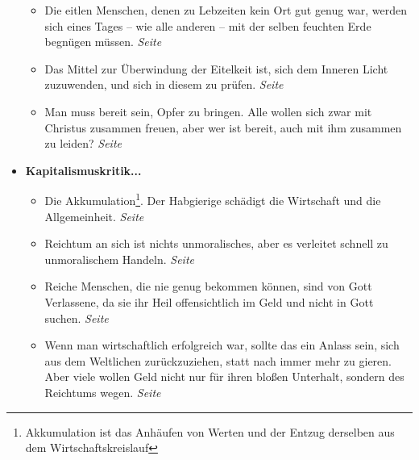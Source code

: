 \begin{itemize}
\begin{itemize}
 \item Die eitlen Menschen, denen zu Lebzeiten kein Ort gut genug war,
werden sich eines Tages -- wie alle anderen -- mit der selben feuchten Erde
begnügen müssen.
 \dotfill \textit{Seite~\pageref{ref:12_10_eitle_menschen_tod}}\\

 \item Das Mittel zur Überwindung der Eitelkeit ist, sich dem Inneren Licht
zuzuwenden, und sich in diesem zu prüfen.
 \dotfill \textit{Seite~\pageref{ref:12_11_eitle_menschen_erloesung}}\\

 \item Man muss bereit sein, Opfer zu bringen. Alle wollen sich zwar mit Christus
zusammen freuen, aber wer ist bereit, auch mit ihm zusammen zu leiden?
 \dotfill \textit{Seite~\pageref{ref:12_11_opfer}}\\

 \end{itemize}


 \item \textbf{Kapitalismuskritik...}

\begin{itemize}
 \item Die Akkumulation\footnote{Akkumulation ist das Anhäufen von Werten und
der Entzug derselben aus dem Wirtschaftskreislauf}. Der Habgierige schädigt die
Wirtschaft und die Allgemeinheit.
 \dotfill \textit{Seite~\pageref{ref:13_01_accumlation}}\\

 \item Reichtum an sich ist nichts unmoralisches, aber es verleitet schnell zu
unmoralischem Handeln.
 \dotfill \textit{Seite~\pageref{ref:13_05_reichtum}}\\

 \item Reiche Menschen, die nie genug bekommen können, sind von Gott Verlassene,
da sie ihr Heil offensichtlich im Geld und nicht in Gott suchen.
 \dotfill \textit{Seite~\pageref{ref:13_06_reichtum_unersaettlichkeit}}\\

 \item Wenn man wirtschaftlich erfolgreich war, sollte das ein Anlass sein, sich
aus dem Weltlichen zurückzuziehen, statt nach immer mehr zu gieren. Aber viele
wollen Geld nicht nur für ihren bloßen Unterhalt, sondern des Reichtums wegen.
 \dotfill \textit{Seite~\pageref{ref:13_07_reichtum_genuegsamkeit}}\\


\end{itemize}
\end{itemize}
